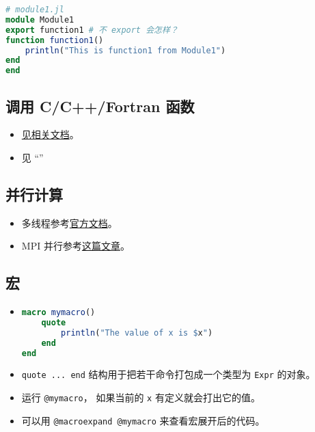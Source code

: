 \begin{lstlisting}[language=julia]
# module1.jl
module Module1
export function1 # 不 export 会怎样？
function function1()
    println("This is function1 from Module1")
end
end
\end{lstlisting}

\subsection{调用 C/C++/Fortran 函数}
\begin{itemize}
\item \href{https://docs.julialang.org/en/v1/manual/calling-c-and-fortran-code/}{见相关文档}。
\item 见 “”
\end{itemize}

\subsection{并行计算}
\begin{itemize}
\item 多线程参考\href{https://docs.julialang.org/en/v1/manual/multi-threading/}{官方文档}。
\item MPI 并行参考\href{http://www.claudiobellei.com/2018/09/30/julia-mpi/}{这篇文章}。
\end{itemize}

\subsection{宏}
\begin{itemize}
\item 
\begin{lstlisting}[language=julia]
macro mymacro()
    quote
        println("The value of x is $x")
    end
end
\end{lstlisting}
\item \verb`quote ... end` 结构用于把若干命令打包成一个类型为 \verb`Expr` 的对象。
\item 运行 \verb`@mymacro`， 如果当前的 \verb`x` 有定义就会打出它的值。
\item 可以用 \verb`@macroexpand @mymacro` 来查看宏展开后的代码。
\end{itemize}


